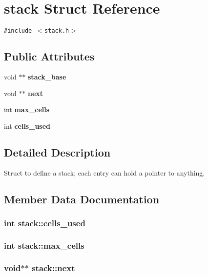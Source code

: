 \section{stack Struct Reference}
\label{structstack}
{\tt \#include $<$stack.h$>$}

\subsection*{Public Attributes}
\begin{CompactItemize}
\item 
void $\ast$$\ast$ \bf{stack\_\-base}
\item 
void $\ast$$\ast$ \bf{next}
\item 
int \bf{max\_\-cells}
\item 
int \bf{cells\_\-used}
\end{CompactItemize}


\subsection{Detailed Description}
Struct to define a stack; each entry can hold a pointer to anything. 



\subsection{Member Data Documentation}
\subsubsection{\setlength{\rightskip}{0pt plus 5cm}int \bf{stack::cells\_\-used}}\label{structstack_5681ffcbd5ccbed72cb6d08266b0dcc2}


\subsubsection{\setlength{\rightskip}{0pt plus 5cm}int \bf{stack::max\_\-cells}}\label{structstack_9d8fcd2716174bd1d8e3bd7a189fb674}


\subsubsection{\setlength{\rightskip}{0pt plus 5cm}void$\ast$$\ast$ \bf{stack::next}}\label{structstack_839ccf270fa84caa016744d92acdbcd0}


